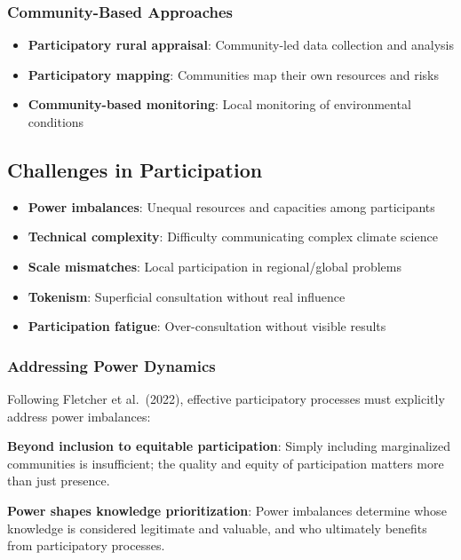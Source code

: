 \documentclass[
  letterpaper,
  DIV=11,
  numbers=noendperiod]{scrreprt}
\providecommand{\tightlist}{%
  \setlength{\itemsep}{0pt}\setlength{\parskip}{0pt}}
\begin{document}
\subsubsection{Community-Based
Approaches}\label{community-based-approaches}

\begin{itemize}
\tightlist
\item
  \textbf{Participatory rural appraisal}: Community-led data collection
  and analysis
\item
  \textbf{Participatory mapping}: Communities map their own resources
  and risks
\item
  \textbf{Community-based monitoring}: Local monitoring of environmental
  conditions
\end{itemize}

\subsection{Challenges in
Participation}\label{challenges-in-participation}

\begin{itemize}
\tightlist
\item
  \textbf{Power imbalances}: Unequal resources and capacities among
  participants
\item
  \textbf{Technical complexity}: Difficulty communicating complex
  climate science
\item
  \textbf{Scale mismatches}: Local participation in regional/global
  problems
\item
  \textbf{Tokenism}: Superficial consultation without real influence
\item
  \textbf{Participation fatigue}: Over-consultation without visible
  results
\end{itemize}

\subsubsection{Addressing Power
Dynamics}\label{addressing-power-dynamics}

Following Fletcher et al.~(2022), effective participatory processes must
explicitly address power imbalances:

\textbf{Beyond inclusion to equitable participation}: Simply including
marginalized communities is insufficient; the quality and equity of
participation matters more than just presence.

\textbf{Power shapes knowledge prioritization}: Power imbalances
determine whose knowledge is considered legitimate and valuable, and who
ultimately benefits from participatory processes.
\end{document}
